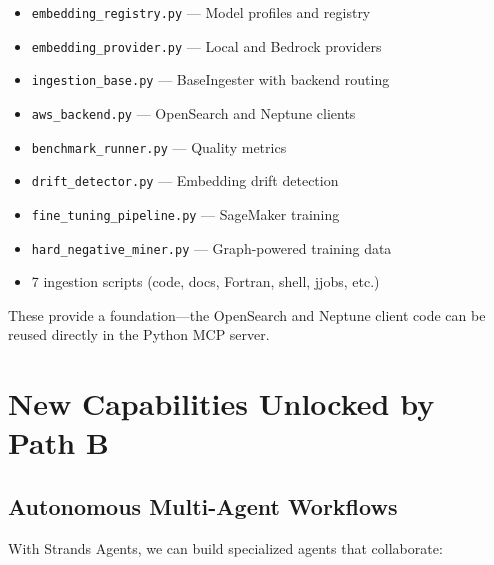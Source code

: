 \documentclass[11pt,letterpaper]{article}
\begin{document}
\begin{itemize}[noitemsep]
    \item \texttt{embedding\_registry.py} --- Model profiles and registry
    \item \texttt{embedding\_provider.py} --- Local and Bedrock providers
    \item \texttt{ingestion\_base.py} --- BaseIngester with backend routing
    \item \texttt{aws\_backend.py} --- OpenSearch and Neptune clients
    \item \texttt{benchmark\_runner.py} --- Quality metrics
    \item \texttt{drift\_detector.py} --- Embedding drift detection
    \item \texttt{fine\_tuning\_pipeline.py} --- SageMaker training
    \item \texttt{hard\_negative\_miner.py} --- Graph-powered training data
    \item 7 ingestion scripts (code, docs, Fortran, shell, jjobs, etc.)
\end{itemize}

These provide a foundation---the OpenSearch and Neptune client code can
be reused directly in the Python MCP server.

\section{New Capabilities Unlocked by Path B}

\subsection{Autonomous Multi-Agent Workflows}

With Strands Agents, we can build specialized agents that collaborate:
\end{document}
